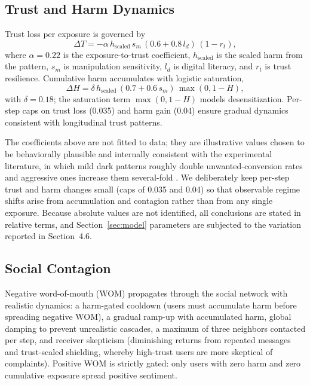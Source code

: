 \documentclass[a4paper,fleqn]{cas-sc}
\begin{document}
\subsection{Trust and Harm Dynamics}
Trust loss per exposure is governed by
\begin{equation}
\Delta T = -\alpha \, h_{\text{scaled}} \, s_m \, (0.6 + 0.8\,l_d)\,(1 - r_t),
\end{equation}
where $\alpha = 0.22$ is the exposure-to-trust coefficient, $h_{\text{scaled}}$ is the scaled harm from the pattern, $s_m$ is manipulation sensitivity, $l_d$ is digital literacy, and $r_t$ is trust resilience. Cumulative harm accumulates with logistic saturation,
\begin{equation}
\Delta H = \delta \, h_{\text{scaled}} \, (0.7 + 0.6\,s_m)\,\max(0, 1 - H),
\end{equation}
with $\delta = 0.18$; the saturation term $\max(0, 1-H)$ models desensitization. Per-step caps on trust loss (0.035) and harm gain (0.04) ensure gradual dynamics consistent with longitudinal trust patterns.

The coefficients above are not fitted to data; they are illustrative values chosen to be behaviorally plausible and internally consistent with the experimental literature, in which mild dark patterns roughly double unwanted-conversion rates and aggressive ones increase them several-fold \citep{luguri2021}. We deliberately keep per-step trust and harm changes small (caps of 0.035 and 0.04) so that observable regime shifts arise from accumulation and contagion rather than from any single exposure. Because absolute values are not identified, all conclusions are stated in relative terms, and Section~\ref{sec:model} parameters are subjected to the variation reported in Section~4.6.

\subsection{Social Contagion}
Negative word-of-mouth (WOM) propagates through the social network with realistic dynamics: a harm-gated cooldown (users must accumulate harm before spreading negative WOM), a gradual ramp-up with accumulated harm, global damping to prevent unrealistic cascades, a maximum of three neighbors contacted per step, and receiver skepticism (diminishing returns from repeated messages and trust-scaled shielding, whereby high-trust users are more skeptical of complaints). Positive WOM is strictly gated: only users with zero harm and zero cumulative exposure spread positive sentiment.
\end{document}
